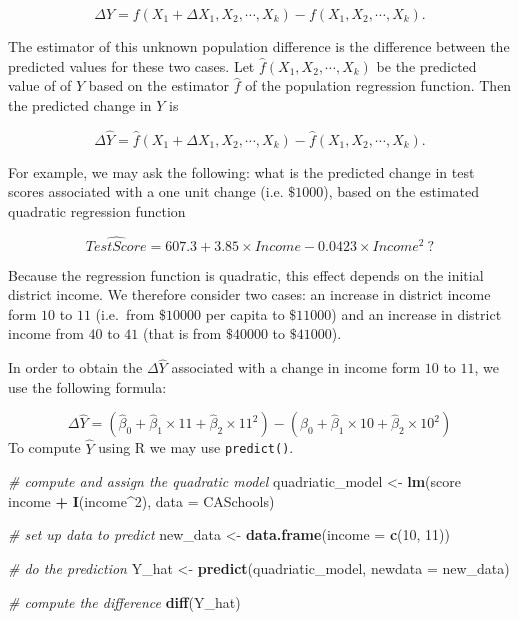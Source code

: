 \documentclass[]{book}
\newenvironment{Shaded}{\begin{snugshade}}{\end{snugshade}}
\newcommand{\KeywordTok}[1]{\textcolor[rgb]{0.13,0.29,0.53}{\textbf{#1}}}
\newcommand{\DataTypeTok}[1]{\textcolor[rgb]{0.13,0.29,0.53}{#1}}
\newcommand{\DecValTok}[1]{\textcolor[rgb]{0.00,0.00,0.81}{#1}}
\newcommand{\StringTok}[1]{\textcolor[rgb]{0.31,0.60,0.02}{#1}}
\newcommand{\CommentTok}[1]{\textcolor[rgb]{0.56,0.35,0.01}{\textit{#1}}}
\newcommand{\OperatorTok}[1]{\textcolor[rgb]{0.81,0.36,0.00}{\textbf{#1}}}
\newcommand{\NormalTok}[1]{#1}
\theoremstyle{definition}
\theoremstyle{definition}
\theoremstyle{definition}
\theoremstyle{remark}
\begin{document}
\[\Delta Y = f(X_1 + \Delta X_1, X_2, \cdots, X_k) - f(X_1, X_2, \cdots, X_k).\]

The estimator of this unknown population difference is the difference
between the predicted values for these two cases. Let
\(\hat{f}(X_1, X_2, \cdots, X_k)\) be the predicted value of of \(Y\)
based on the estimator \(\hat{f}\) of the population regression
function. Then the predicted change in \(Y\) is

\[\Delta \hat{Y} = \hat{f}(X_1 + \Delta X_1, X_2, \cdots, X_k) - \hat{f}(X_1, X_2, \cdots, X_k).\]

For example, we may ask the following: what is the predicted change in
test scores associated with a one unit change (i.e. \(\$1000\)), based
on the estimated quadratic regression function

\[\widehat{TestScore} = 607.3 + 3.85 \times Income - 0.0423 \times Income^2\ ?\]

Because the regression function is quadratic, this effect depends on the
initial district income. We therefore consider two cases: an increase in
district income form \(10\) to \(11\) (i.e.~from \(\$10000\) per capita
to \(\$11000\)) and an increase in district income from \(40\) to \(41\)
(that is from \(\$40000\) to \(\$41000\)).

In order to obtain the \(\Delta \hat{Y}\) associated with a change in
income form \(10\) to \(11\), we use the following formula:

\[\Delta \hat{Y} = \left(\hat{\beta}_0 + \hat{\beta}_1 \times 11 + \hat{\beta}_2 \times 11^2\right) - \left(\hat{\beta}_0 + \hat{\beta}_1 \times 10 + \hat{\beta}_2 \times 10^2\right) \]
To compute \(\hat{Y}\) using R we may use \texttt{predict()}.

\begin{Shaded}
\begin{Highlighting}[]
\CommentTok{# compute and assign the quadratic model}
\NormalTok{quadriatic_model <-}\StringTok{ }\KeywordTok{lm}\NormalTok{(score }\OperatorTok{~}\StringTok{ }\NormalTok{income }\OperatorTok{+}\StringTok{ }\KeywordTok{I}\NormalTok{(income}\OperatorTok{^}\DecValTok{2}\NormalTok{), }\DataTypeTok{data =}\NormalTok{ CASchools)}

\CommentTok{# set up data to predict}
\NormalTok{new_data <-}\StringTok{ }\KeywordTok{data.frame}\NormalTok{(}\DataTypeTok{income =} \KeywordTok{c}\NormalTok{(}\DecValTok{10}\NormalTok{, }\DecValTok{11}\NormalTok{))}

\CommentTok{# do the prediction}
\NormalTok{Y_hat <-}\StringTok{ }\KeywordTok{predict}\NormalTok{(quadriatic_model, }\DataTypeTok{newdata =}\NormalTok{ new_data)}

\CommentTok{# compute the difference}
\KeywordTok{diff}\NormalTok{(Y_hat)}
\end{Highlighting}
\end{Shaded}
\end{document}
